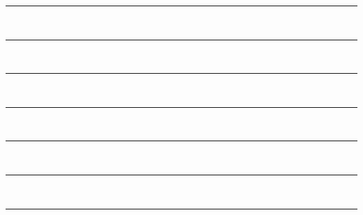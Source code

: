\documentclass[a4paper, 11pt, oneside]{book} %
\begin{document}
 

\begin{titlepage} %

	\centering %
	
	\scshape %
	
	\vspace*{\baselineskip} %
	
	
	\rule{\textwidth}{1.6pt} \\ \vspace*{-\baselineskip}\vspace*{5pt} %
	\rule{12cm}{1.4pt} \\ \vspace*{-\baselineskip}\vspace*{4.8pt}
	\rule{11cm}{1.2pt} \\ \vspace*{-\baselineskip}\vspace*{4.6pt}%
	\rule{10cm}{1.0pt} \\ \vspace*{-\baselineskip}\vspace*{4.4pt}
	\rule{9cm}{0.8pt} \\ \vspace*{-\baselineskip}\vspace*{4.2pt}
	\rule{8cm}{0.6pt} \\ \vspace*{-\baselineskip}\vspace*{4.0pt}
	\rule{7cm}{0.4pt}%
	
	

\end{titlepage}
\end{document}
